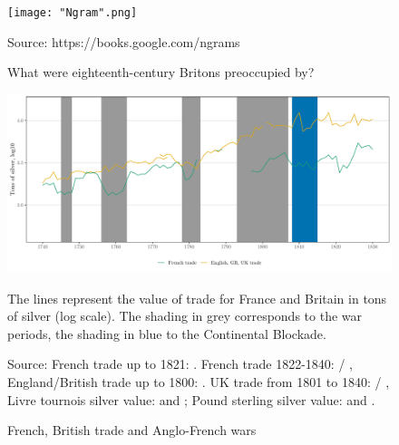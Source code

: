 \documentclass[12pt,a4paper,notitlepage,english]{article}
\newcommand{\fontsmall}{\fontsize{10pt}{12pt}\selectfont}
\newcommand{\source}[1]{\caption*{\footnotesize Source: {#1}} }
\begin{document}
\pagebreak

\renewcommand{\baselinestretch}{1.0}\normalsize




\clearpage


\begin{appendix}




\begin{figure}[h!]
	\caption{What were eighteenth-century Britons preoccupied by?}
	\centering
	\texttt{[image: "Ngram".png]}
	\source{https://books.google.com/ngrams}
	\label{Ngram}
\end{figure}


\begin{figure}[h!]
\caption{French, British trade and Anglo-French wars}\label{FrBritTrade}
\centering
\includegraphics[scale=.2]{Total_silver_trade_FR_GB}
\begin{minipage}{18cm}
\begin{flushleft}
\fontsmall
The lines represent the value of trade for France and Britain in tons of silver (log scale). The shading in grey corresponds to the war periods, the shading in blue to the Continental Blockade.
\source{French trade up to 1821: \cite{Daudin2020}. French trade 1822-1840: \cite{Federico2016} / \cite{Dedinger2017},
England/British trade up to 1800: \cite{Deane1969}. UK trade from 1801 to 1840: \cite{Federico2016} / \cite{Dedinger2017},
Livre tournois silver value: \cite{Dewailly1857} and \cite{Hoffman2000}; Pound sterling silver value: \cite{Clark2006} and \cite{Jastram1981}. }
\end{flushleft}
\end{minipage}
\end{figure}



\end{appendix}
\end{document}
